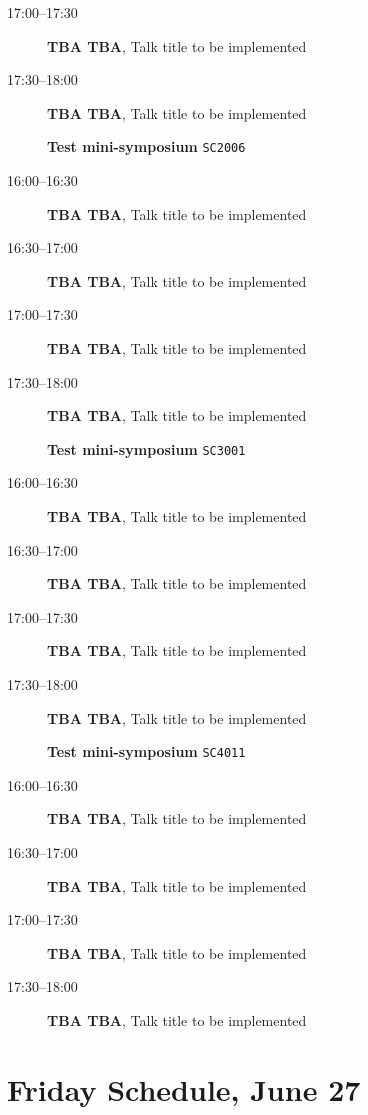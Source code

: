\documentclass[ILAS2025-program.tex]{subfiles}
\begin{document}
\begin{description}
\begin{description}
        \item[17:00--17:30] \textbf{TBA TBA}, Talk title to be implemented
        \item[17:30--18:00] \textbf{TBA TBA}, Talk title to be implemented
        \end{description}
    \begin{description}
    \item[] \textbf{Test mini-symposium} {\footnotesize\texttt{SC2006}}
    \item[16:00--16:30] \textbf{TBA TBA}, Talk title to be implemented
        \item[16:30--17:00] \textbf{TBA TBA}, Talk title to be implemented
        \item[17:00--17:30] \textbf{TBA TBA}, Talk title to be implemented
        \item[17:30--18:00] \textbf{TBA TBA}, Talk title to be implemented
        \end{description}
    \begin{description}
    \item[] \textbf{Test mini-symposium} {\footnotesize\texttt{SC3001}}
    \item[16:00--16:30] \textbf{TBA TBA}, Talk title to be implemented
        \item[16:30--17:00] \textbf{TBA TBA}, Talk title to be implemented
        \item[17:00--17:30] \textbf{TBA TBA}, Talk title to be implemented
        \item[17:30--18:00] \textbf{TBA TBA}, Talk title to be implemented
        \end{description}
    \begin{description}
    \item[] \textbf{Test mini-symposium} {\footnotesize\texttt{SC4011}}
    \item[16:00--16:30] \textbf{TBA TBA}, Talk title to be implemented
        \item[16:30--17:00] \textbf{TBA TBA}, Talk title to be implemented
        \item[17:00--17:30] \textbf{TBA TBA}, Talk title to be implemented
        \item[17:30--18:00] \textbf{TBA TBA}, Talk title to be implemented
        \end{description}
    \end{description}
    \newpage

\section{Friday Schedule, June 27}
    
\end{document}

